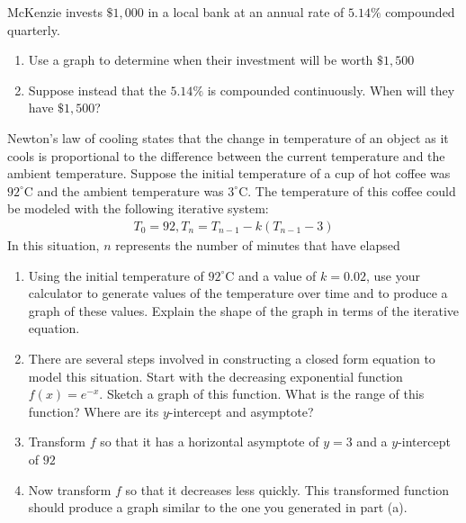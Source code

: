 \documentclass[10pt,]{book}
\theoremstyle{ptxdefinitionnotitle}
\theoremstyle{ptxdefinitiontitle}
\theoremstyle{ptxdefinitionnotitle}
\theoremstyle{ptxdefinitiontitle}
\theoremstyle{ptxdefinitionnotitle}
\theoremstyle{ptxdefinitiontitle}
\numberwithin{equation}{section}
\begin{document}
\begin{divisionexercise}{7}\hypertarget{exercise-68}{}
\hypertarget{p-264}{}%
McKenzie invests \(\$1,000\) in a local bank at an annual rate of \(5.14\%\) compounded quarterly.%
\leavevmode%
\begin{enumerate}[label=(\alph*)]
\item\hypertarget{li-149}{}Use a graph to determine when their investment will be worth \(\$1,500\)%
\item\hypertarget{li-150}{}Suppose instead that the \(5.14\%\) is compounded continuously. When will they have \(\$1,500\)?%
\end{enumerate}
\end{divisionexercise}%
\begin{divisionexercise}{8}\hypertarget{exercise-69}{}
\hypertarget{p-265}{}%
Newton's law of cooling states that the change in temperature of an object as it cools is proportional to the difference between the current temperature and the ambient temperature.  Suppose the initial temperature of a cup of hot coffee was \(92^\circ\)C and the ambient temperature was \(3^\circ\)C.  The temperature of this coffee could be modeled with the following iterative system:%
%
\begin{gather*}
T_0 = 92,  T_n = T_{n-1} - k \left( T_{n-1} - 3 \right)
\end{gather*}
\hypertarget{p-266}{}%
In this situation, \(n\) represents the number of minutes that have elapsed%
\leavevmode%
\begin{enumerate}[label=(\alph*)]
\item\hypertarget{li-151}{}Using the initial temperature of \(92^\circ\)C and a value of \(k = 0.02\), use your calculator to generate values of the temperature over time and to produce a graph of these values.  Explain the shape of the graph in terms of the iterative equation.%
\item\hypertarget{li-152}{}There are several steps involved in constructing a closed form equation to model this situation.  Start with the decreasing exponential function \(f(x) = e^{-x}\).  Sketch a graph of this function.  What is the range of this function?  Where are its \(y\)-intercept and asymptote?%
\item\hypertarget{li-153}{}Transform \(f\) so that it has a horizontal asymptote of \(y=3\) and a \(y\)-intercept of \(92\)%
\item\hypertarget{li-154}{}Now transform \(f\) so that it decreases less quickly. This transformed function should produce a graph similar to the one you generated in part (a).%
\end{enumerate}
\end{divisionexercise}%
\end{document}
